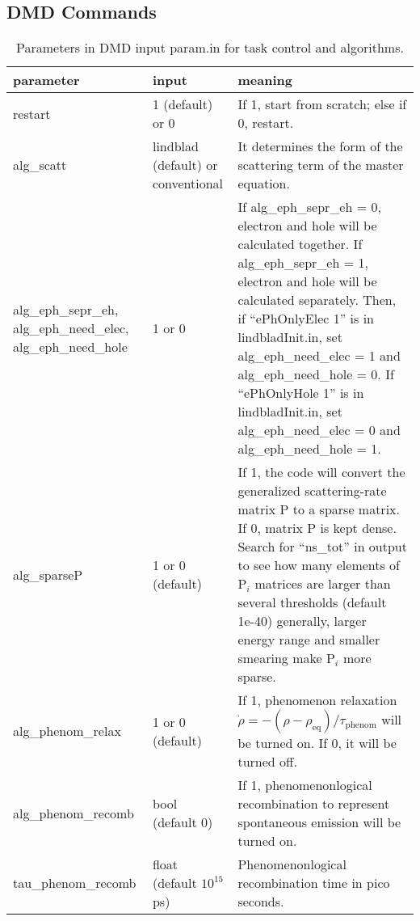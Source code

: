 \documentclass{article}
\begin{document}
\subsection{DMD Commands}
	\begin{xltabular}{\textwidth}{X X X}
		\caption{Parameters in DMD input param.in for task control and algorithms.}\\
		\toprule\toprule
		parameter & input & meaning \\
		\midrule
		
		restart & 1 (default) or 0 & If 1, start from scratch; else if 0, restart.\\
		\midrule
		
		alg\_scatt & lindblad (default) or conventional & It determines the form of the scattering term of the master equation.\\
		\midrule
		
		alg\_eph\_sepr\_eh, alg\_eph\_need\_elec, alg\_eph\_need\_hole & 1 or 0 & If alg\_eph\_sepr\_eh = 0, electron and hole will be calculated together. If alg\_eph\_sepr\_eh = 1, electron and hole will be calculated separately. Then, if ``ePhOnlyElec 1'' is in lindbladInit.in, set  alg\_eph\_need\_elec = 1 and alg\_eph\_need\_hole = 0. If ``ePhOnlyHole 1'' is in lindbladInit.in, set  alg\_eph\_need\_elec = 0 and alg\_eph\_need\_hole = 1.\\
		\midrule
		
		alg\_sparseP & 1 or 0 (default) & If 1, the code will convert the generalized scattering-rate matrix P to a sparse matrix. If 0, matrix P is kept dense. Search for ``ns\_tot'' in output to see how many elements of $\mathrm{P}_i$ matrices are larger than several thresholds (default 1e-40) generally, larger energy range and smaller smearing make $\mathrm{P}_i$ more sparse.\\
		\midrule
		
		alg\_phenom\_relax & 1 or 0 (default) & If 1, phenomenon relaxation $\dot{\rho} = -(\rho - \rho_\text{eq}) / \tau_\text{phenom}$ will be turned on. If 0, it will be turned off.\\
		\midrule

		alg\_phenom\_recomb & bool (default 0) & If 1, phenomenonlogical recombination to represent spontaneous emission will be turned on.\\
		
		tau\_phenom\_recomb & float (default $10^{15}$ ps) & Phenomenonlogical recombination time in pico seconds.\\
		\midrule
		

\end{xltabular}
\end{document}
